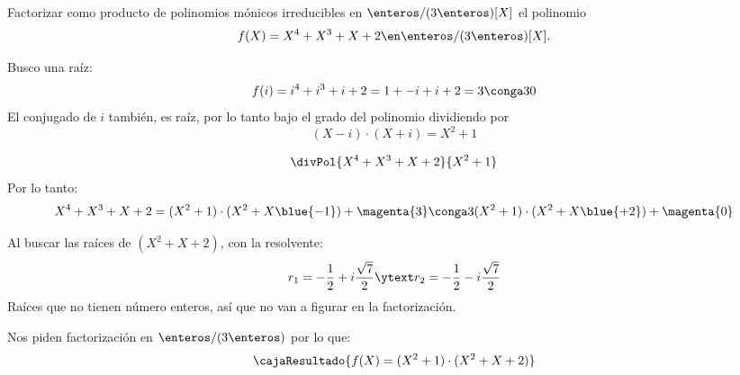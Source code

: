 \begin{enunciado}{\ejExtra}
  Factorizar como producto de polinomios mónicos irreducibles en $\enteros/(3\enteros)[X]$ el polinomio
  $$
    f(X) = X^4 + X^3 + X + 2 \en \enteros / (3 \enteros)[X].
  $$
\end{enunciado}

Busco una raíz:
$$
  f(i) = i^4 + i^3 + i + 2 = 1 + -i + i + 2 = 3 \conga3 0
$$
El conjugado de $i$ también, es raíz, por lo tanto bajo el grado del polinomio dividiendo por
$$
  (X - i) \cdot (X + i) = X^2 + 1
$$

$$
  \divPol{X^4 + X^3 + X + 2}{X^2 + 1}
$$
Por lo tanto:
$$
  X^4 + X^3 + X + 2 =
  (X^2 + 1) \cdot (X^2 + X \blue{- 1}) + \magenta{3}
  \conga3
  (X^2 + 1) \cdot (X^2 + X \blue{+ 2}) + \magenta{0}
$$

Al buscar las raíces de $(X^2 + X + 2)$, con la resolvente:
$$
  r_1 = -\frac{1}{2} + i \frac{\sqrt{7}}{2}
  \ytext
  r_2 = -\frac{1}{2} - i \frac{\sqrt{7}}{2}
$$
Raíces que no tienen número enteros, así que no van a figurar en la factorización.

Nos piden factorización en $\enteros/(3\enteros)$ por lo que:
$$
  \cajaResultado{
    f(X) = (X^2 + 1) \cdot (X^2 + X + 2)
  }
$$

\begin{aportes}
  \item {}
\end{aportes}

